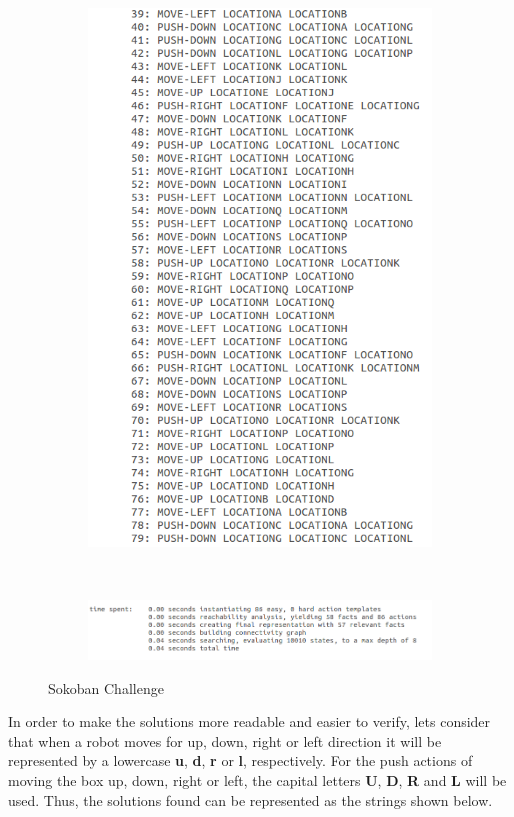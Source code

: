 \documentclass[10pt, letter]{article}
\begin{document}
\begin{figure} [h!]
\begin{subfigure}{.5\textwidth}
  \includegraphics[scale = 0.3]{images/FF_Solution_p2_challenge_2}
\end{subfigure}\\
\begin{subfigure}{\textwidth}
  \centering
  \includegraphics[scale = 0.3]{images/FF_Solution_p2_challenge_3}
\end{subfigure}%
\caption{Sokoban Challenge}
\label{fig_prob2_challenge}
\end{figure}

In order to make the solutions more readable and easier to verify, lets consider that when a robot moves for up, down, right or left direction it will be represented by a lowercase \textbf{u}, \textbf{d}, \textbf{r} or \textbf{l}, respectively. For the push actions of moving the box up, down, right or left, the capital letters \textbf{U}, \textbf{D}, \textbf{R} and \textbf{L} will be used. Thus, the solutions found can be represented as the strings shown below.
\end{document}

